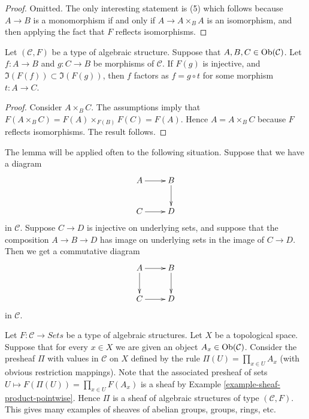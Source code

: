 \begin{proof}
Omitted. The only interesting statement is (5) which
follows because $A \to B$ is a monomorphism if and only if
$A \to A \times_B A$ is an isomorphism, and then applying
the fact that $F$ reflects isomorphisms.
\end{proof}

\begin{lemma}
\label{lemma-image-contained-in}
Let $(\mathcal{C}, F)$ be a type of algebraic structure.
Suppose that $A, B, C \in \mathop{\mathrm{Ob}}\nolimits(\mathcal{C})$.
Let $f : A \to B$ and $g : C \to B$ be morphisms of
$\mathcal{C}$. If $F(g)$ is injective, and
$\Im(F(f)) \subset \Im(F(g))$, then
$f$ factors as $f = g \circ t$ for some morphism
$t : A \to C$.
\end{lemma}

\begin{proof}
Consider $A \times_B C$. The assumptions imply that
$F(A \times_B C) = F(A) \times_{F(B)} F(C) = F(A)$.
Hence $A = A \times_B C$ because $F$ reflects isomorphisms.
The result follows.
\end{proof}

\begin{example}
\label{example-application-lemma-image-contained-in}
The lemma will be applied often to the following situation.
Suppose that we have a diagram
$$
\xymatrix{
A \ar[r] & B \ar[d] \\
C \ar[r] & D
}
$$
in $\mathcal{C}$. Suppose $C \to D$ is injective on underlying
sets, and suppose that the composition $A \to B \to D$ has
image on underlying sets in the image of $C \to D$.
Then we get a commutative diagram
$$
\xymatrix{
A \ar[r] \ar[d] & B \ar[d] \\
C \ar[r] & D
}
$$
in $\mathcal{C}$.
\end{example}

\begin{example}
\label{example-sheaf-product-pointwise-algebraic-structure}
Let $F : \mathcal{C} \to \textit{Sets}$ be a
type of algebraic structures.
Let $X$ be a topological space. Suppose that
for every $x \in X$ we are given an object
$A_x \in \mathop{\mathrm{Ob}}\nolimits(\mathcal{C})$. Consider the presheaf
$\Pi$ with values in $\mathcal{C}$ on $X$ defined by the rule
$\Pi(U) = \prod_{x \in U} A_x$ (with obvious restriction
mappings). Note that the associated presheaf of sets
$U \mapsto F(\Pi(U)) = \prod_{x \in U} F(A_x)$ is a sheaf
by Example \ref{example-sheaf-product-pointwise}.
Hence $\Pi$ is a sheaf of algebraic structures
of type $(\mathcal{C} , F)$. This gives many examples
of sheaves of abelian groups, groups, rings, etc.
\end{example}













